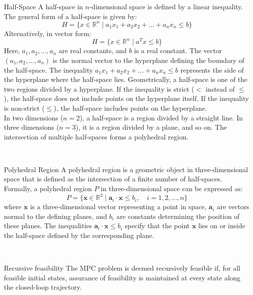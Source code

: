 \begin{definition}{Half-Space}
	A half-space in $n$-dimensional space is defined by a linear inequality. The general form of a half-space is given by:
	\begin{equation}
		H = \{x \in \mathbb{R}^n \mid a_1x_1 + a_2x_2 + \ldots + a_nx_n \leq b\}
	\end{equation}
	Alternatively, in vector form:
	\begin{equation}
		H = \{x \in \mathbb{R}^n \mid a^Tx \leq b\}
	\end{equation}
	Here, $a_1, a_2, \ldots, a_n$ are real constants, and $b$ is a real constant. The vector $(a_1, a_2, \ldots, a_n)$ is the normal vector to the hyperplane defining the boundary of the half-space. The inequality $a_1x_1 + a_2x_2 + \ldots + a_nx_n \leq b$ represents the side of the hyperplane where the half-space lies.
	Geometrically, a half-space is one of the two regions divided by a hyperplane. If the inequality is strict ($<$ instead of $\leq$), the half-space does not include points on the hyperplane itself. If the inequality is non-strict ($\leq$), the half-space includes points on the hyperplane. \\
	In two dimensions ($n = 2$), a half-space is a region divided by a straight line. In three dimensions ($n = 3$), it is a region divided by a plane, and so on. The intersection of multiple half-spaces forms a polyhedral region.
\end{definition}\\



\begin{definition}{Polyhedral Region}
	A polyhedral region is a geometric object in three-dimensional space that is defined as the intersection of a finite number of half-spaces. 
	Formally, a polyhedral region $P$ in three-dimensional space can be expressed as:
	\[ P = \{ \mathbf{x} \in \mathbb{R}^3 \mid \mathbf{a}_i \cdot \mathbf{x} \leq b_i, \quad i = 1, 2, \ldots, n \} \]
	where $\mathbf{x}$ is a three-dimensional vector representing a point in space, $\mathbf{a}_i$ are vectors normal to the defining planes, and $b_i$ are constants determining the position of these planes. The inequalities $\mathbf{a}_i \cdot \mathbf{x} \leq b_i$ specify that the point $\mathbf{x}$ lies on or inside the half-space defined by the corresponding plane.
\end{definition}\\

\begin{definition}{Recursive feasibility}
	The MPC problem is deemed recursively feasible if, for all feasible initial states, assurance of feasibility is maintained at every state along the closed-loop trajectory.
\end{definition}\\

